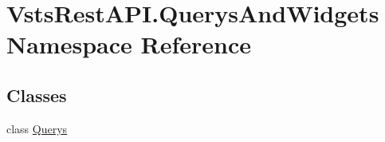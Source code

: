 \hypertarget{namespace_vsts_rest_a_p_i_1_1_querys_and_widgets}{}\section{Vsts\+Rest\+A\+P\+I.\+Querys\+And\+Widgets Namespace Reference}
\label{namespace_vsts_rest_a_p_i_1_1_querys_and_widgets}
\subsection*{Classes}
\begin{DoxyCompactItemize}
\item 
class \mbox{\hyperlink{class_vsts_rest_a_p_i_1_1_querys_and_widgets_1_1_querys}{Querys}}
\end{DoxyCompactItemize}
